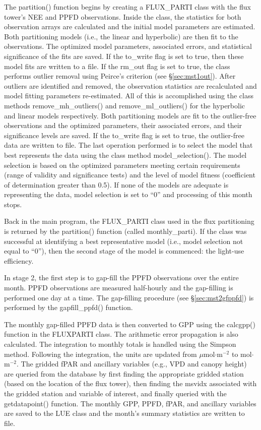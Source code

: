 The partition() function begins by creating a FLUX\_PARTI class with the flux tower's NEE and PPFD observations.  
Inside the class, the statistics for both observation arrays are calculated and the initial model parameters are estimated.  
Both partitioning models (i.e., the linear and hyperbolic) are then fit to the observations.  
The optimized model parameters, associated errors, and statistical significance of the fits are saved.  
If the to\_write flag is set to true, then these model fits are written to a file.  If the rm\_out flag is set to true, the class performs outlier removal using Peirce's criterion (see \S \ref{sec:mst1out}).  
After outliers are identified and removed, the observation statistics are recalculated and model fitting parameters re-estimated.  
All of this is accomplished using the class methods remove\_mh\_outliers() and remove\_ml\_outliers() for the hyperbolic and linear models respectively.  
Both partitioning models are fit to the outlier-free observations and the optimized parameters, their associated errors, and their significance levels are saved.  
If the to\_write flag is set to true, the outlier-free data are written to file.  
The last operation performed is to select the model that best represents the data using the class method model\_selection().  
The model selection is based on the optimized parameters meeting certain requirements (range of validity and significance tests) and the level of model fitness (coefficient of determination greater than 0.5).  
If none of the models are adequate is representing the data, model selection is set to ``0'' and processing of this month stops.

Back in the main program, the FLUX\_PARTI class used in the flux partitioning is returned by the partition() function (called monthly\_parti).  
If the class was successful at identifying a best representative model (i.e., model selection not equal to ``0''), then the second stage of the model is commenced: the light-use efficiency.

In stage 2, the first step is to gap-fill the PPFD observations over the entire month.  PPFD observations are measured half-hourly and the gap-filling is performed one day at a time.  
The gap-filling procedure (see \S \ref{sec:mst2gfppfd}) is performed by the gapfill\_ppfd() function.  

The monthly gap-filled PPFD data is then converted to GPP using the calc\textunderscore gpp() function in the FLUX\textunderscore PARTI class.  
The arithmetic error propagation is also calculated.  
The integration to monthly totals is handled using the Simpson method.  
Following the integration, the units are updated from $\mu$mol$\cdot$m$^{-2}$ to mol$\cdot$m$^{-2}$.  
The gridded fPAR and ancillary variables (e.g., VPD and canopy height) are queried from the database by first finding the appropriate gridded station (based on the location of the flux tower), then finding the msvidx associated with the gridded station and variable of interest, and finally queried with the get\textunderscore data\textunderscore point() function.  
The monthly GPP, PPFD, fPAR, and ancillary variables are saved to the LUE class and the month's summary statistics are written to file.

